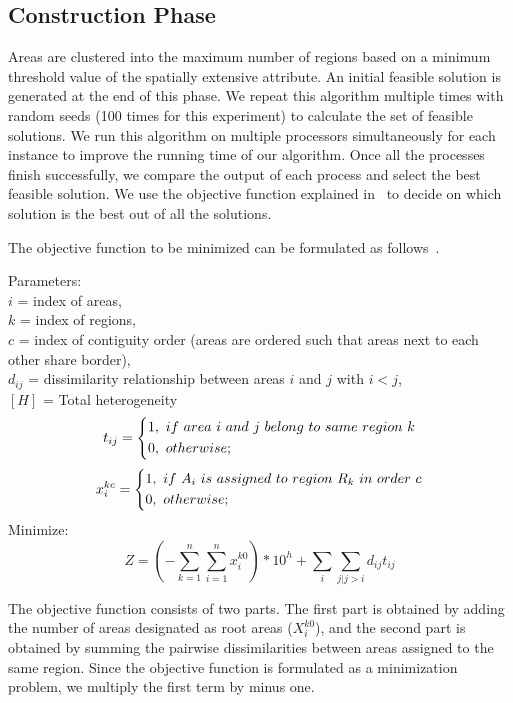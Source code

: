 \documentclass[conference]{IEEEtran}
\begin{document}
\subsection{Construction Phase}
Areas are clustered into the maximum number of regions based on
a minimum threshold value of the spatially extensive attribute. An initial feasible
solution is generated at the end of this phase. We repeat this algorithm
multiple times with random seeds (100 times for this experiment) to calculate the set of feasible
solutions. We run this algorithm on multiple processors simultaneously for each
instance to improve the running time of our algorithm. Once all the processes
finish successfully, we compare the output of each process and select the best
feasible solution. We use the objective function explained in~\cite{r1} to
decide on which solution is the best out of all the solutions.

The objective function to be minimized  can be formulated as follows~\cite{r1}.

Parameters:\\
$i$ = index of areas,\\
$k$ = index of regions,\\
$c$ = index of contiguity order (areas are ordered such that areas next to each other share border),\\
$d_{ij}$ = dissimilarity relationship between areas $i$ and $j$ with $i < j$,\\
$[H]$ = Total heterogeneity\\
\begin{equation*}[H]
t_{ij} = \begin{dcases*}
        1,\ if\ area\ i\ and\ j\ belong\ to\ same\ region\ k\\
        0,\ otherwise;
        \end{dcases*}
\end{equation*}
\begin{equation*}[H]
x_i^{kc} = \begin{dcases*}
        1,\ if\ A_i\ is\ assigned\ to\ region\ R_k\ in\ order\ c\\
        0,\ otherwise;
        \end{dcases*}
\end{equation*}
Minimize:
\begin{equation*}[H]
Z = (-\sum_{k=1}^n \sum_{i=1}^n x_i^{k0}) *10^h + \sum_{i} \sum_{j|j>i} d_{ij} t_{ij}
\end{equation*}

The objective function consists of two parts. The first
part is obtained by adding the number of areas designated as root areas
($X_i^{k0}$), and the second part is obtained by summing the pairwise
dissimilarities between areas assigned to the same region. Since the objective
function is formulated as a minimization problem, we multiply the first term by
minus one.
\end{document}
